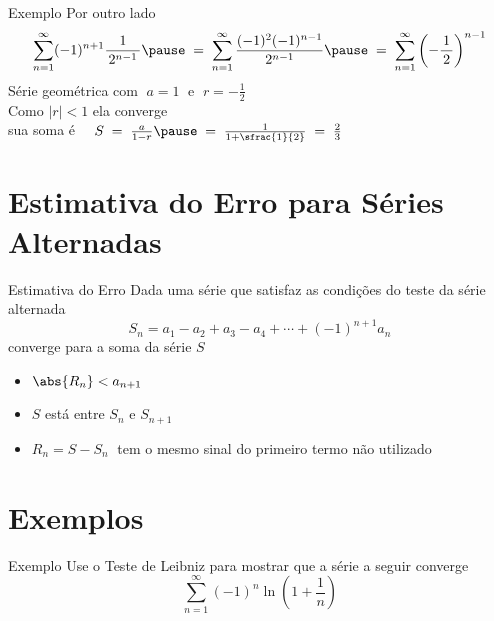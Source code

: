 \documentclass[fleqn,utf8,aspectratio=169,12pt]{beamer}
\begin{document}
\begin{frame}{Exemplo \theexemplo}
  Por outro lado
  \[
    \sum_{n=1}^{\infty} (-1)^{n+1} \frac{1}{\,2^{n-1}\,}
    \pause
    \;=\; \sum_{n=1}^{\infty} \frac{(-1)^2(-1)^{n-1}}{\,2^{n-1}\,}
    \pause
    \;=\; \sum_{n=1}^{\infty} \left( -\frac{1}{\,2\,} \right)^{n-1}
  \]
  \pause
  Série geométrica com $\;a=1\;$ e \(\;r=-\frac{1}{2}\;\) \\[5mm]

  \pause
  \vspace{0.5\baselineskip}
  Como $|r|<1$ ela converge \\[5mm]

  \pause
  sua soma é
  \(\quad
    S \;=\; \frac{a}{1-r}
      \pause
      \;=\; \frac{1}{1+\sfrac{1}{2}}
      \;=\; \frac{2}{3}
  \)
\end{frame}

\section{Estimativa do Erro para Séries Alternadas}

\begin{frame}{Estimativa do Erro}
  Dada uma série que satisfaz as condições do teste da série alternada
  \pause
  \[ S_n = a_1 - a_2 + a_3 - a_4 + \cdots + (-1)^{n+1}a_n \]
  converge para a soma da série $S$
  \pause
  \begin{itemize}[<+->]
    \item \( \abs{R_n} < a_{n+1} \)
    \item $S$ está entre $S_n$ e $S_{n+1}$
    \item \( R_n = S - S_n \;\) tem o mesmo sinal do primeiro termo não utilizado
  \end{itemize}
\end{frame}


\section{Exemplos}

\addtocounter{exemplo}{1}
\begin{frame}{Exemplo \theexemplo}
  Use o Teste de Leibniz para mostrar que a série a seguir converge
  \[
    \sum_{n=1}^\infty(-1)^{n}\ln\left(1+\frac{1}{n}\right)
  \]
\end{frame}
\end{document}
